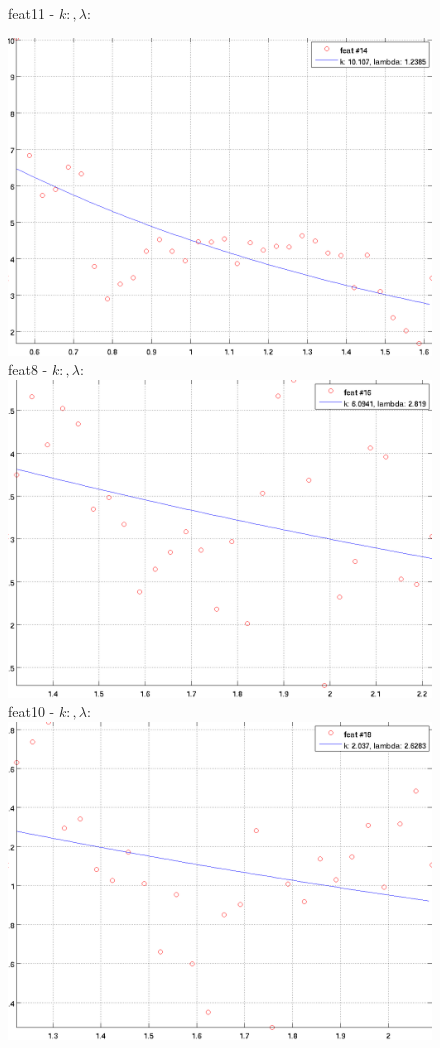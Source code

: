 \documentclass[12pt]{report}
\begin{document}
\begin{figure}
\begin{minipage}[t]{0.3\linewidth}
	feat11 - $k: , \lambda:  $\\
\end{minipage}
\begin{minipage}[t]{0.3\linewidth}
	\centering
	\includegraphics[scale=\imFeatScale]{images/feat14}
	feat8 - $k: , \lambda:  $\\
	\includegraphics[scale=\imFeatScale]{images/feat16}
	feat10 - $k: , \lambda:  $\\
	\includegraphics[scale=\imFeatScale]{images/feat18}

\end{minipage}
\end{figure}
\end{document}
